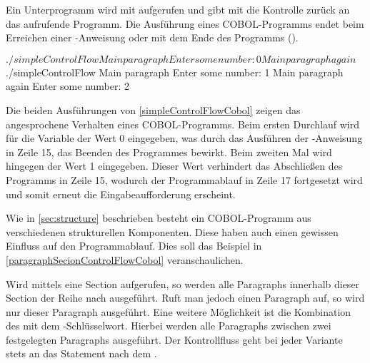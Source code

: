 Ein Unterprogramm wird mit  aufgerufen und gibt mit  die Kontrolle zurück an das aufrufende Programm. Die Ausführung eines COBOL-Programms endet beim Erreichen einer -Anweisung oder mit dem Ende des Programms (). 

\sepCodeAndOutputCheck
\begin{shellwindow}
$ ./simpleControlFlow 
Main paragraph
Enter some number: 0
Main paragraph again
$ ./simpleControlFlow 
Main paragraph
Enter some number: 1 
Main paragraph again
Enter some number: 2
\end{shellwindow}

Die beiden Ausführungen von \autoref{simpleControlFlowCobol} zeigen das angesprochene Verhalten eines COBOL-Programms. Beim ersten Durchlauf wird für die Variable  der Wert 0 eingegeben, was durch das Ausführen der -Anweisung in Zeile 15, das Beenden des Programmes bewirkt. Beim zweiten Mal wird hingegen der Wert 1 eingegeben. Dieser Wert verhindert das Abschließen des Programms in Zeile 15, wodurch der Programmablauf in Zeile 17 fortgesetzt wird und somit erneut die Eingabeaufforderung erscheint.

Wie in \autoref{sec:structure} beschrieben besteht ein COBOL-Programm aus verschiedenen strukturellen Komponenten. Diese haben auch einen gewissen Einfluss auf den Pro\-grammab\-lauf. Dies soll das Beispiel in \autoref{paragraphSecionControlFlowCobol} veranschaulichen.

\sepCodeAndOutputCheck
{}

Wird mittels  eine Section aufgerufen, so werden alle Paragraphs innerhalb dieser Section der Reihe nach ausgeführt. Ruft man jedoch einen Paragraph auf, so wird nur dieser Paragraph ausgeführt. Eine weitere Möglichkeit ist die Kombination des  mit dem -Schlüsselwort. Hierbei werden alle Paragraphs zwischen zwei festgelegten Paragraphs ausgeführt. Der Kontrollfluss geht bei jeder Variante stets an das Statement nach dem .

